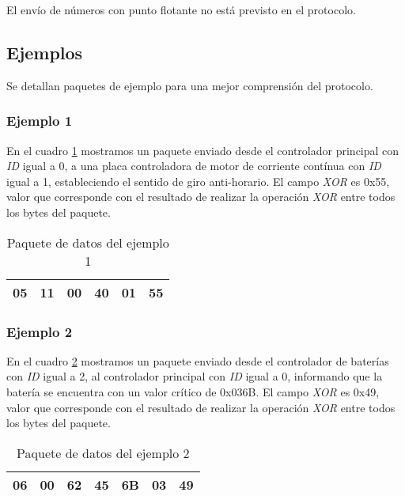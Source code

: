 El env\'io de n\'umeros con punto flotante no est\'a previsto en el protocolo.

\subsection{Ejemplos}
\label{hA_protocolo_ejemplos}

Se detallan paquetes de ejemplo para una mejor comprensi\'on del protocolo.

\subsubsection{Ejemplo 1}
\label{hA_protocolo_ejemplo1}

En el cuadro \ref{hA_protocolo_paquete_ejemplo1} mostramos un paquete enviado desde el controlador principal con \emph{ID} igual a 0,
a una placa controladora de motor de corriente cont\'inua con \emph{ID} igual a 1, estableciendo el sentido de giro anti-horario.
El campo \emph{XOR} es 0x55, valor que corresponde con el resultado de realizar la operaci\'on \emph{XOR} entre
todos los bytes del paquete.

\begin{table}[h]
\begin{center}
\begin{tabular}{|c|c|c|c|c|c|}
\hline
05 & 11 & 00 & 40 & 01 & 55 \\
\hline
\end{tabular}
\caption{Paquete de datos del ejemplo 1}
\label{hA_protocolo_paquete_ejemplo1}
\end{center}
\end{table}

\subsubsection{Ejemplo 2}
\label{hA_protocolo_ejemplo2}

En el cuadro \ref{hA_protocolo_paquete_ejemplo2} mostramos un paquete enviado desde el controlador de bater\'ias con \emph{ID} igual a 2,
al controlador principal con \emph{ID} igual a 0, informando que la bater\'ia se encuentra con un valor cr\'itico de 0x036B.
El campo \emph{XOR} es 0x49, valor que corresponde con el resultado de realizar la operaci\'on \emph{XOR} entre
todos los bytes del paquete.

\begin{table}[h]
\begin{center}
\begin{tabular}{|c|c|c|c|c|c|c|}
\hline
06 & 00 & 62 & 45 & 6B & 03 & 49 \\
\hline
\end{tabular}
\caption{Paquete de datos del ejemplo 2}
\label{hA_protocolo_paquete_ejemplo2}
\end{center}
\end{table}

